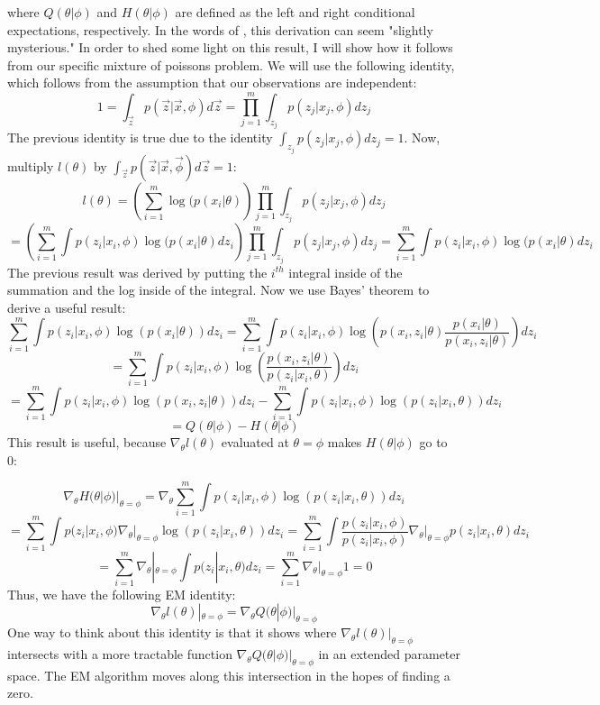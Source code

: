 \documentclass[letter,12pt]{article}
\begin{document}
where $Q(\theta|\phi)$ and $H(\theta|\phi)$ are defined as the left and right conditional expectations, respectively.  In the words of \cite{lange1995a}, this derivation can seem "slightly mysterious."  In order to shed some light on this result, I will show how it follows from our specific mixture of poissons problem.  We will use the following identity, which follows from the assumption that our observations are independent:
\[
1 = \int_{\vec{z}}p(\vec{z}|\vec{x},\phi)d\vec{z}
= \prod_{j=1}^{m}\int_{z_j}p(z_j|x_j,\phi)dz_j
\]
The previous identity is true due to the identity $\int_{z_j}p(z_j|x_j,\phi)dz_j=1$.  Now, multiply $l(\theta)$ by $\int_{\vec{z}}p(\vec{z}|\vec{x},\vec{\phi})d\vec{z}=1$:
\[
l(\theta)
= \left( \sum_{i=1}^{m} \log(p(x_i|\theta)\right)
\prod_{j=1}^{m}\int_{z_j}p(z_j|x_j,\phi)dz_j
\]
\[
= \left( \sum_{i=1}^{m} \int p(z_i|x_i,\phi)\log(p(x_i|\theta)dz_i\right)
\prod_{j=1}^{m}\int_{z_j}p(z_j|x_j,\phi)dz_j
=\sum_{i=1}^{m} \int p(z_i|x_i,\phi)\log(p(x_i|\theta)dz_i
\]
The previous result was derived by putting the $i^{th}$ integral inside of the summation and the log inside of the integral.  Now we use Bayes' theorem to derive a useful result:
\[
\sum_{i=1}^{m} \int p(z_i|x_i,\phi)\log(p(x_i|\theta))dz_i
= \sum_{i=1}^{m} \int p(z_i|x_i,\phi) \log \left(p(x_i,z_i|\theta)\frac{p(x_i|\theta)}{p(x_i,z_i|\theta)}\right) dz_i
\]
\[
=
\sum_{i=1}^{m} \int p(z_i|x_i,\phi) \log \left(\frac{p(x_i,z_i|\theta)}{p(z_i|x_i,\theta)}\right) dz_i
\]
\[
=
\sum_{i=1}^{m} \int p(z_i|x_i,\phi) \log \left(p(x_i,z_i|\theta)\right) dz_i
-
\sum_{i=1}^{m} \int p(z_i|x_i,\phi) \log \left(p(z_i|x_i,\theta)\right) dz_i
\] 
\[
=Q(\theta|\phi)
-H(\theta|\phi)
\]
This result is useful, because $\nabla_{\theta}l(\theta)$ evaluated at $\theta = \phi$ makes $H(\theta|\phi)$ go to 0: 

\[
\nabla_{\theta}H(\theta|\phi)|_{\theta = \phi}
=
\nabla_{\theta}\sum_{i=1}^{m} \int p(z_i|x_i,\phi) \log \left(p(z_i|x_i,\theta)\right) dz_i
\]
\[
=
\sum_{i=1}^{m} 
\int p(z_i|x_i,\phi) 
\nabla_{\theta}|_{\theta = \phi}
\log \left(p(z_i|x_i,\theta)\right) dz_i
=
\sum_{i=1}^{m} 
\int \dfrac{p(z_i|x_i,\phi)}{p(z_i|x_i,\phi)} 
\nabla_{\theta}|_{\theta = \phi}
p(z_i|x_i,\theta) dz_i
\]
\[
=
\sum_{i=1}^{m} 
\nabla_{\theta}|_{\theta = \phi}
\int 
p(z_i|x_i,\theta) dz_i
=
\sum_{i=1}^{m} 
\nabla_{\theta}|_{\theta = \phi}
1
=0
\]
Thus, we have the following EM identity:
\begin{equation} \label{eq:dl_is_dq}
\nabla_{\theta}l(\theta)|_{\theta = \phi}
=
\nabla_{\theta}Q(\theta|\phi)|_{\theta = \phi}
\end{equation}
One way to think about this identity is that it shows where $\nabla_{\theta}l(\theta)|_{\theta = \phi}$ intersects with a more tractable function $\nabla_{\theta}Q(\theta|\phi)|_{\theta = \phi}$ in an extended parameter space.  The EM algorithm moves along this intersection in the hopes of finding a zero.
\end{document}
